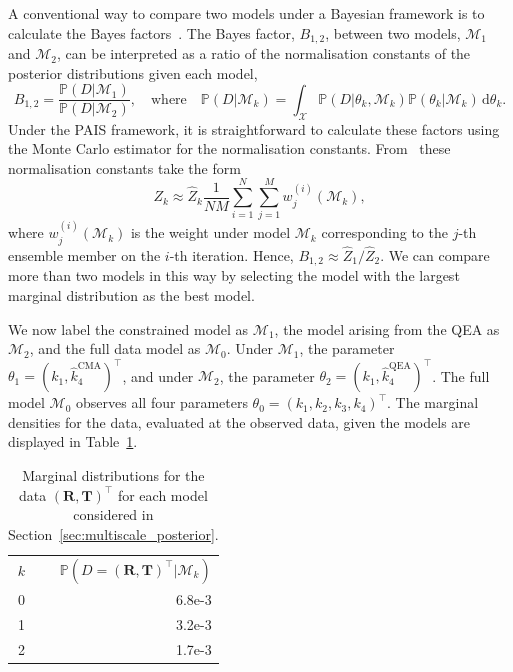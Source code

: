 \documentclass[final]{siamltex}
\begin{document}
A conventional way to compare two models under a Bayesian framework is to calculate the Bayes factors~\cite{chen2012monte}. The Bayes factor, $B_{1,2}$, between two models, $\mathcal{M}_1$ and $\mathcal{M}_2$, can be interpreted as a ratio of the normalisation constants of the posterior distributions given each model,
\[
	B_{1,2} = \frac{\mathbb{P}(D|\mathcal{M}_1)}{\mathbb{P}(D|\mathcal{M}_2)}, \quad \text{where} \quad \mathbb{P}(D|\mathcal{M}_k) = \int_\mathcal{X} \mathbb{P}(D|\theta_k,\mathcal{M}_k)\mathbb{P}(\theta_k|\mathcal{M}_k) \, \text{d}\theta_k.
\]
Under the PAIS framework, it is straightforward to calculate these factors using the Monte Carlo estimator for the normalisation constants. From~\cite{robert2013monte} these normalisation constants take the form
\[
	Z_k \approx \hat{Z}_k\frac{1}{NM}\sum_{i=1}^N\sum_{j=1}^M w_j^{(i)}(\mathcal{M}_k),
\]
where $w_j^{(i)}(\mathcal{M}_k)$ is the weight under model $\mathcal{M}_k$ corresponding to the $j$-th ensemble member on the $i$-th iteration. Hence, $B_{1,2} \approx \hat{Z}_1/\hat{Z}_2$. We can compare more than two models in this way by selecting the model with the largest marginal distribution as the best model.

We now label the constrained model as $\mathcal{M}_1$, the model arising from the QEA as $\mathcal{M}_2$, and the full data model as $\mathcal{M}_0$. Under $\mathcal{M}_1$, the parameter $\theta_1 = (k_1, \hat{k}_4^{\text{CMA}})^\top$, and under $\mathcal{M}_2$, the parameter $\theta_2 = (k_1, \hat{k}_4^{\text{QEA}})^\top$. The full model $\mathcal{M}_0$ observes all four parameters $\theta_0 = (k_1, k_2, k_3, k_4)^\top$. The marginal densities for the data, evaluated at the observed data, given the models are displayed in Table~\ref{tab:chem_Bayes_marginals}.

\begin{table}[!htb]
\centering
\begin{tabular}{rr}
	\toprule
	$k$ & \quad $\mathbb{P}(D = (\mathbf{R},\mathbf{T})^\top|\mathcal{M}_k)$ \\ \cmidrule(lr){1-2}
	0 & 6.8e-3 \\
	1 & 3.2e-3 \\
	2 & 1.7e-3 \\ \bottomrule
\end{tabular}
\caption{Marginal distributions for the data $(\mathbf{R},\mathbf{T})^\top$ for each model considered in Section~\ref{sec:multiscale_posterior}.}
\label{tab:chem_Bayes_marginals}
\end{table}
\end{document}
